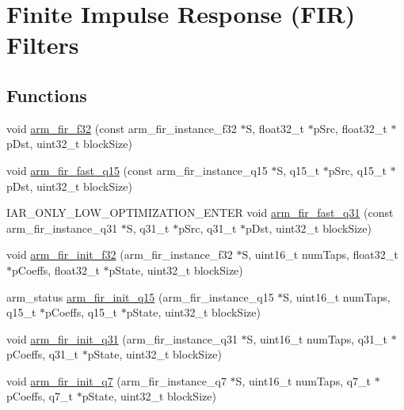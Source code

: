 \hypertarget{group__FIR}{}\section{Finite Impulse Response (F\+IR) Filters}
\label{group__FIR}
\subsection*{Functions}
\begin{DoxyCompactItemize}
\item 
void \hyperlink{group__FIR_gae8fb334ea67eb6ecbd31824ddc14cd6a}{arm\+\_\+fir\+\_\+f32} (const arm\+\_\+fir\+\_\+instance\+\_\+f32 $\ast$S, float32\+\_\+t $\ast$p\+Src, float32\+\_\+t $\ast$p\+Dst, uint32\+\_\+t block\+Size)
\item 
void \hyperlink{group__FIR_gac7d35e9472e49ccd88800f37f3476bd3}{arm\+\_\+fir\+\_\+fast\+\_\+q15} (const arm\+\_\+fir\+\_\+instance\+\_\+q15 $\ast$S, q15\+\_\+t $\ast$p\+Src, q15\+\_\+t $\ast$p\+Dst, uint32\+\_\+t block\+Size)
\item 
I\+A\+R\+\_\+\+O\+N\+L\+Y\+\_\+\+L\+O\+W\+\_\+\+O\+P\+T\+I\+M\+I\+Z\+A\+T\+I\+O\+N\+\_\+\+E\+N\+T\+ER void \hyperlink{group__FIR_ga70d11af009dcd25594c58c75cdb5d6e3}{arm\+\_\+fir\+\_\+fast\+\_\+q31} (const arm\+\_\+fir\+\_\+instance\+\_\+q31 $\ast$S, q31\+\_\+t $\ast$p\+Src, q31\+\_\+t $\ast$p\+Dst, uint32\+\_\+t block\+Size)
\item 
void \hyperlink{group__FIR_ga98d13def6427e29522829f945d0967db}{arm\+\_\+fir\+\_\+init\+\_\+f32} (arm\+\_\+fir\+\_\+instance\+\_\+f32 $\ast$S, uint16\+\_\+t num\+Taps, float32\+\_\+t $\ast$p\+Coeffs, float32\+\_\+t $\ast$p\+State, uint32\+\_\+t block\+Size)
\item 
arm\+\_\+status \hyperlink{group__FIR_gae2a50f692f41ba57e44ed0719b1368bd}{arm\+\_\+fir\+\_\+init\+\_\+q15} (arm\+\_\+fir\+\_\+instance\+\_\+q15 $\ast$S, uint16\+\_\+t num\+Taps, q15\+\_\+t $\ast$p\+Coeffs, q15\+\_\+t $\ast$p\+State, uint32\+\_\+t block\+Size)
\item 
void \hyperlink{group__FIR_gac00d53af87684cbbe135767b55e748a5}{arm\+\_\+fir\+\_\+init\+\_\+q31} (arm\+\_\+fir\+\_\+instance\+\_\+q31 $\ast$S, uint16\+\_\+t num\+Taps, q31\+\_\+t $\ast$p\+Coeffs, q31\+\_\+t $\ast$p\+State, uint32\+\_\+t block\+Size)
\item 
void \hyperlink{group__FIR_ga88e48688224d42dc173dbcec702f0c1d}{arm\+\_\+fir\+\_\+init\+\_\+q7} (arm\+\_\+fir\+\_\+instance\+\_\+q7 $\ast$S, uint16\+\_\+t num\+Taps, q7\+\_\+t $\ast$p\+Coeffs, q7\+\_\+t $\ast$p\+State, uint32\+\_\+t block\+Size)

\end{DoxyCompactItemize}
